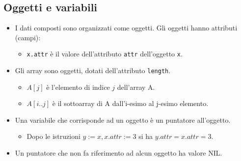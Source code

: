 \subsection{Oggetti e variabili}

\begin{multicols}{2} %

\begin{itemize}
    \item I dati composti sono organizzati come oggetti. Gli oggetti hanno attributi (campi):
    \begin{itemize}
        \item \texttt{x.attr} è il valore dell'attributo \texttt{attr} dell'oggetto \texttt{x}.
    \end{itemize}
    \item Gli array sono oggetti, dotati dell'attributo \texttt{length}.
    \begin{itemize}
        \item \(A[j]\) è l'elemento di indice \(j\) dell'array A.
        \item \(A[i..j]\) è il sottoarray di A dall'i-esimo al j-esimo elemento.
    \end{itemize}
    \item Una variabile che corrisponde ad un oggetto è un puntatore all'oggetto.
    \begin{itemize}
        \item Dopo le istruzioni \( y := x, x.attr := 3 \) si ha \( y.attr = x.attr = 3 \).
    \end{itemize}
    \item Un puntatore che non fa riferimento ad alcun oggetto ha valore NIL.
\end{itemize}

\end{multicols}
